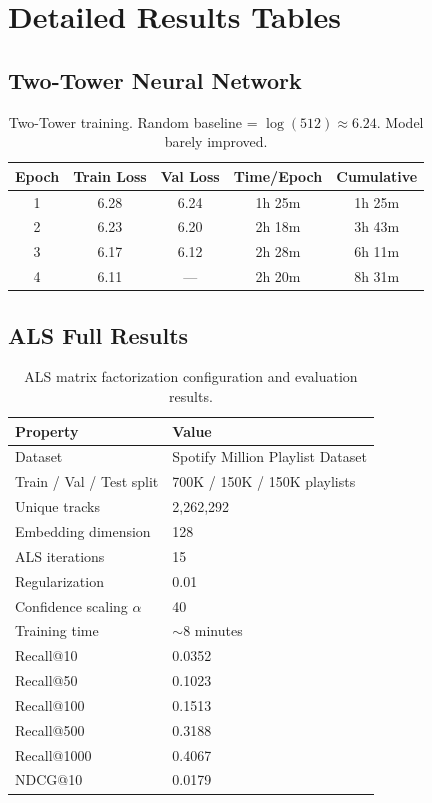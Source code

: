 \documentclass[11pt,a4paper]{article}
\begin{document}

\newpage
\appendix

\section{Detailed Results Tables}

\subsection{Two-Tower Neural Network}

\begin{table}[H]
\centering
\begin{tabular}{ccccc}
\toprule
\textbf{Epoch} & \textbf{Train Loss} & \textbf{Val Loss} & \textbf{Time/Epoch} & \textbf{Cumulative} \\
\midrule
1 & 6.28 & 6.24 & 1h 25m & 1h 25m \\
2 & 6.23 & 6.20 & 2h 18m & 3h 43m \\
3 & 6.17 & 6.12 & 2h 28m & 6h 11m \\
4 & 6.11 & — & 2h 20m & 8h 31m \\
\bottomrule
\end{tabular}
\caption{Two-Tower training. Random baseline = $\log(512) \approx 6.24$. Model barely improved.}
\end{table}

\subsection{ALS Full Results}

\begin{table}[h]
\centering
\caption{ALS matrix factorization configuration and evaluation results.}
\label{tab:als_detailed_results}
\begin{tabular}{ll}
\hline
\textbf{Property} & \textbf{Value} \\
\hline
Dataset & Spotify Million Playlist Dataset \\
Train / Val / Test split & 700K / 150K / 150K playlists \\
Unique tracks & 2,262,292 \\
Embedding dimension & 128 \\
ALS iterations & 15 \\
Regularization & 0.01 \\
Confidence scaling $\alpha$ & 40 \\
Training time & $\sim$8 minutes \\
\hline
Recall@10 & 0.0352 \\
Recall@50 & 0.1023 \\
Recall@100 & 0.1513 \\
Recall@500 & 0.3188 \\
Recall@1000 & 0.4067 \\
NDCG@10 & 0.0179 \\
\hline
\end{tabular}
\end{table}
\end{document}
